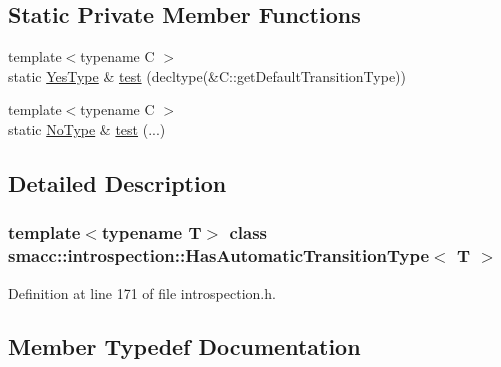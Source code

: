 \subsection*{Static Private Member Functions}
\begin{DoxyCompactItemize}
\item 
{\footnotesize template$<$typename C $>$ }\\static \hyperlink{classsmacc_1_1introspection_1_1HasAutomaticTransitionType_abeb599df547eb3db36684b6cb343eade}{Yes\+Type} \& \hyperlink{classsmacc_1_1introspection_1_1HasAutomaticTransitionType_a3521b68e2adb57520d3ca8cfbea082fb}{test} (decltype(\&C\+::get\+Default\+Transition\+Type))
\item 
{\footnotesize template$<$typename C $>$ }\\static \hyperlink{classsmacc_1_1introspection_1_1HasAutomaticTransitionType_aa2e976214fc770f53aaae67fc049caab}{No\+Type} \& \hyperlink{classsmacc_1_1introspection_1_1HasAutomaticTransitionType_a660ac4a6eac5d86d133f2cfb905d22f3}{test} (...)
\end{DoxyCompactItemize}


\subsection{Detailed Description}
\subsubsection*{template$<$typename T$>$\newline
class smacc\+::introspection\+::\+Has\+Automatic\+Transition\+Type$<$ T $>$}



Definition at line 171 of file introspection.\+h.



\subsection{Member Typedef Documentation}
\mbox{\label{classsmacc_1_1introspection_1_1HasAutomaticTransitionType_aa2e976214fc770f53aaae67fc049caab}} 
